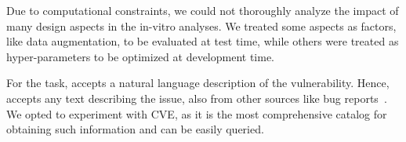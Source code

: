 Due to computational constraints, we could not thoroughly analyze the impact of many design aspects in the in-vitro analyses.
We treated some aspects as factors, like data augmentation, to be evaluated at test time, while others were treated as hyper-parameters to be optimized at development time.


For the \matching task, \vuteco accepts a natural language description of the vulnerability.
Hence, \vuteco accepts any text describing the issue, also from other sources like bug reports~\cite{zhou2017automated,le2019automated,bao2022v,nguyen2023multi,iannone:tosem2024:exploit}.
We opted to experiment with CVE, as it is the most comprehensive catalog for obtaining such information and can be easily queried.



